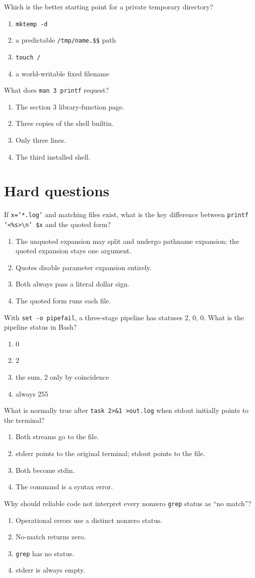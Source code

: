 \documentclass[11pt,oneside,openany]{book}
\newcommand{\fourchoices}[4]{%
  \begin{enumerate}[label=\Alph*),leftmargin=2em,itemsep=0.25em]
    \item #1
    \item #2
    \item #3
    \item #4
  \end{enumerate}}
\begin{document}
\begin{questionbox}[title={Medium 19 -- Temporary resources}]
Which is the better starting point for a private temporary directory?
\fourchoices{\texttt{mktemp -d}}{a predictable \texttt{/tmp/name.\$\$} path}{\texttt{touch /}}{a world-writable fixed filename}
\end{questionbox}

\begin{questionbox}[title={Medium 20 -- Manual sections}]
What does \texttt{man 3 printf} request?
\fourchoices{The section 3 library-function page.}{Three copies of the shell builtin.}{Only three lines.}{The third installed shell.}
\end{questionbox}

\section{Hard questions}
\begin{questionbox}[title={Hard 21 -- Expansion boundaries}]
If \texttt{x='*.log'} and matching files exist, what is the key difference between \texttt{printf '<\%s>\textbackslash n' \$x} and the quoted form?
\fourchoices{The unquoted expansion may split and undergo pathname expansion; the quoted expansion stays one argument.}{Quotes disable parameter expansion entirely.}{Both always pass a literal dollar sign.}{The quoted form runs each file.}
\end{questionbox}

\begin{questionbox}[title={Hard 22 -- Pipeline truth}]
With \texttt{set -o pipefail}, a three-stage pipeline has statuses 2, 0, 0. What is the pipeline status in Bash?
\fourchoices{0}{2}{the sum, 2 only by coincidence}{always 255}
\end{questionbox}

\begin{questionbox}[title={Hard 23 -- Left-to-right redirection}]
What is normally true after \texttt{task 2>\&1 >out.log} when stdout initially points to the terminal?
\fourchoices{Both streams go to the file.}{stderr points to the original terminal; stdout points to the file.}{Both become stdin.}{The command is a syntax error.}
\end{questionbox}

\begin{questionbox}[title={Hard 24 -- \texttt{grep} protocol}]
Why should reliable code not interpret every nonzero \texttt{grep} status as “no match”?
\fourchoices{Operational errors use a distinct nonzero status.}{No-match returns zero.}{\texttt{grep} has no status.}{stderr is always empty.}
\end{questionbox}
\end{document}
